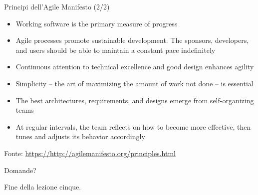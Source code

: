 \documentclass{beamer}
\begin{document}
\begin{frame}{\centerline{Principi dell'Agile Manifesto (2/2)}}

\begin{itemize}
\item  Working software is the primary measure of progress
\item  Agile processes promote sustainable development. The sponsors, developers, and users should be able to maintain a constant pace indefinitely
\item  Continuous attention to technical excellence and good design enhances agility
\item  Simplicity -- the art of maximizing the amount of work not done -- is essential
\item  The best architectures, requirements, and designs emerge from self-organizing teams
\item  At regular intervals, the team reflects on how to become more effective, then tunes and adjusts its behavior accordingly
\end{itemize}

\begin{center}
\tiny
Fonte: \url{https://http://agilemanifesto.org/principles.html}
\end{center}

\end{frame}




\begin{frame}
{\centerline{Domande?}}
\vspace{1cm}
\begin{center}
    \LARGE{Fine della lezione cinque.}
\end{center}

\end{frame}
\end{document}
